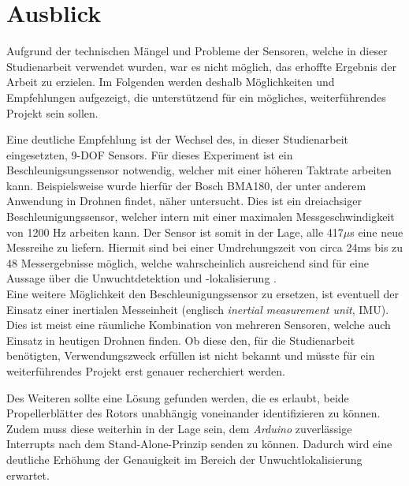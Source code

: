 
\chapter{Ausblick}
Aufgrund der technischen Mängel und Probleme der Sensoren, welche in dieser Studienarbeit verwendet wurden, war es nicht möglich, das erhoffte Ergebnis der Arbeit zu erzielen.
Im Folgenden werden deshalb Möglichkeiten und Empfehlungen aufgezeigt, die unterstützend für ein mögliches, weiterführendes Projekt sein sollen.

Eine deutliche Empfehlung ist der Wechsel des, in dieser Studienarbeit eingesetzten, \ac{9-DOF} Sensors.
Für dieses Experiment ist ein Beschleunigsungssensor notwendig, welcher mit einer höheren Taktrate arbeiten kann.
Beispielsweise wurde hierfür der Bosch BMA180, der unter anderem Anwendung in Drohnen findet, näher untersucht.
Dies ist ein dreiachsiger Beschleunigungssensor, welcher intern mit einer maximalen Messgeschwindigkeit von 1200 \ac{Hz} arbeiten kann.
Der Sensor ist somit in der Lage, alle 417$\mu$s eine neue Messreihe zu liefern.
Hiermit sind bei einer Umdrehungszeit von circa 24ms bis zu 48 Messergebnisse möglich, welche wahrscheinlich ausreichend sind für eine Aussage über die Unwuchtdetektion und -lokalisierung \cite{bosch_bma180}. \\
Eine weitere Möglichkeit den Beschleunigungssensor zu ersetzen, ist eventuell der Einsatz einer inertialen Messeinheit (englisch \textit{inertial measurement unit}, IMU).
Dies ist meist eine räumliche Kombination von mehreren Sensoren, welche auch Einsatz in heutigen Drohnen finden.
Ob diese den, für die Studienarbeit benötigten, Verwendungszweck erfüllen ist nicht bekannt und müsste für ein weiterführendes Projekt erst genauer recherchiert werden.

Des Weiteren sollte eine Lösung gefunden werden, die es erlaubt, beide Propellerblätter des Rotors unabhängig voneinander identifizieren zu können.
Zudem muss diese weiterhin in der Lage sein, dem \emph{Arduino} zuverlässige Interrupts nach dem Stand-Alone-Prinzip senden zu können.
Dadurch wird eine deutliche Erhöhung der Genauigkeit im Bereich der Unwuchtlokalisierung erwartet.
